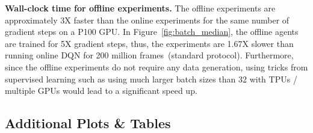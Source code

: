 {\bf Wall-clock time for offline experiments.} The offline experiments are approximately 3X faster than the online experiments for the same number of gradient steps on a P100 GPU. In Figure~\ref{fig:batch_median}, the offline agents are trained for 5X gradient steps, thus, the experiments are 1.67X slower than running online DQN for 200 million frames~(standard protocol). Furthermore, since the offline experiments do not require any data generation, using tricks from supervised learning such as using much larger batch sizes than 32 with TPUs / multiple GPUs would lead to a significant speed up.

\subsection*{Additional Plots \& Tables}

